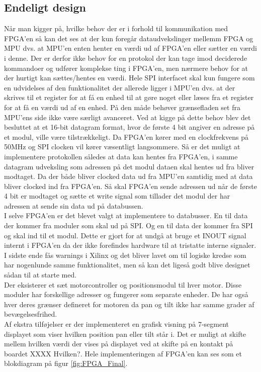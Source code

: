 \subsection{Endeligt design}
Når man kigger på, hvilke behov der er i forhold til kommunikation med FPGA'en så kan det ses at der kun foregår dataudvekslinger mellemm FPGA og MPU dvs. at MPU'en enten henter en værdi ud af FPGA'en eller sætter en værdi i denne. Der er derfor ikke behov for en protokol der kan tage imod deciderede kommandoer og udfører komplekse ting i FPGA'en, men nærmere behov for at der hurtigt kan sættes/hentes en værdi. Hele SPI interfacet skal kun fungere som en udvidelses af den funktionalitet der allerede ligger i MPU'en dvs. at der skrives til et register for at få en enhed til at gøre noget eller læses fra et register for at få en værdi ud af en enhed. På den måde behøver grænsefladen set fra MPU'ens side ikke være særligt avanceret. Ved at kigge på dette behov blev det besluttet at et 16-bit datagram format, hvor de første 4 bit angiver en adresse på et modul, ville være tilstrækkeligt. Da FPGA'en kører med en clockfrekvens på 50MHz og SPI clocken vil kører væsentligt langsommere. Så er det muligt at implementere protokollen således at data kan hentes fra FPGA'en, i samme datagram udveksling som adressen på det modul dataen skal hentes ud fra bliver modtaget. Da der både bliver clocked data ud fra MPU'en samtidig med at data bliver clocked ind fra FPGA'en. Så skal FPGA'en sende adressen ud når de første 4 bit er modtaget og sætte et write signal som tillader det modul der har adressen at sende sin data ud på databussen.\\
I selve FPGA'en er det blevet valgt at implementere to databusser. En til data der kommer fra moduler som skal ud på SPI. Og en til data der kommer fra SPI og skal ind til et modul. Dette er gjort for at undgå at bruge et INOUT signal internt i FPGA'en da der ikke forefindes hardware til at tristatte interne signaler. I sidste ende fås warnings i Xilinx og det bliver lavet om til logiske kredse som har nogenlunde samme funktionalitet, men så kan det ligeså godt blive designet sådan til at starte med.\\
Der eksisterer et sæt motorcontroller og positionsmodul til hver motor. Disse moduler har forskellige adresser og fungerer som separate enheder. De har også hver deres grænser defineret for motoren da pan og tilt ikke har samme grader af bevægelsesfrihed.\\
Af ekstra tilføjelser er der implementeret en grafisk visning på 7-segment displayet som viser hvilken position pan eller tilt står i. Det er muligt at skifte mellem hvilken værdi der vises på displayet ved at skifte på en kontakt på boardet XXXX Hvilken?. Hele implementeringen af FPGA'en kan ses som et blokdiagram på figur \ref{fig:FPGA_Final}.

